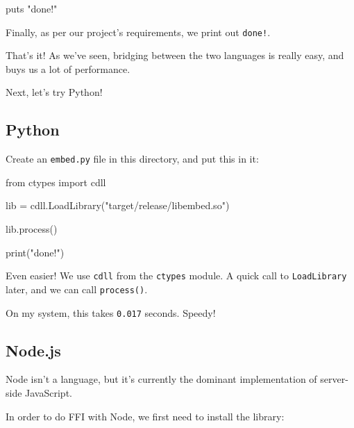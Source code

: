 \documentclass[a4paper,]{book}
\newenvironment{Shaded}{\begin{snugshade}}{\end{snugshade}}
\newcommand{\KeywordTok}[1]{\textcolor[rgb]{0.13,0.29,0.53}{\textbf{{#1}}}}
\newcommand{\DataTypeTok}[1]{\textcolor[rgb]{0.13,0.29,0.53}{{#1}}}
\newcommand{\CharTok}[1]{\textcolor[rgb]{0.31,0.60,0.02}{{#1}}}
\newcommand{\StringTok}[1]{\textcolor[rgb]{0.31,0.60,0.02}{{#1}}}
\newcommand{\NormalTok}[1]{{#1}}
\begin{document}
\begin{Shaded}
\begin{Highlighting}[]
\NormalTok{puts }\StringTok{"done!"}
\end{Highlighting}
\end{Shaded}

Finally, as per our project's requirements, we print out \texttt{done!}.

That's it! As we've seen, bridging between the two languages is really
easy, and buys us a lot of performance.

Next, let's try Python!

\subsection{Python}\label{python}

Create an \texttt{embed.py} file in this directory, and put this in it:

\begin{Shaded}
\begin{Highlighting}[]
\CharTok{from} \NormalTok{ctypes }\CharTok{import} \NormalTok{cdll}

\NormalTok{lib = cdll.LoadLibrary(}\StringTok{"target/release/libembed.so"}\NormalTok{)}

\NormalTok{lib.process()}

\DataTypeTok{print}\NormalTok{(}\StringTok{"done!"}\NormalTok{)}
\end{Highlighting}
\end{Shaded}

Even easier! We use \texttt{cdll} from the \texttt{ctypes} module. A
quick call to \texttt{LoadLibrary} later, and we can call
\texttt{process()}.

On my system, this takes \texttt{0.017} seconds. Speedy!

\subsection{Node.js}\label{node.js}

Node isn't a language, but it's currently the dominant implementation of
server-side JavaScript.

In order to do FFI with Node, we first need to install the library:

\begin{Shaded}
\end{Shaded}
\end{document}
